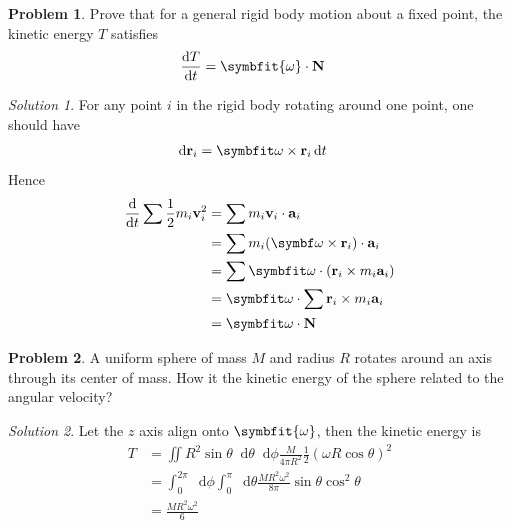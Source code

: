 \documentclass[twoside,11pt]{article}
\newcommand{\lms}{\fontfamily{lmss}\selectfont} %
\renewcommand*\d{\mathop{}\!\mathrm{d}}
\theoremstyle{definition}
\newtheorem{problem}{\lms Problem}
\theoremstyle{remark}
\newtheorem*{solution}{Solution}
\begin{document}
\begin{problem} 
Prove that for a general rigid body motion about a fixed point, the kinetic
energy $T$ satisfies
\begin{align}
    \frac{\d T}{\d t} &= \symbfit{\omega}\cdot \mathbf{N}
\end{align}
\end{problem}
\begin{solution} 
For any point $i$ in the rigid body rotating around one point,
one should have
\begin{align*}
    \d\mathbf r_i &= \symbfit\omega\times\mathbf r_i\d t
\end{align*}
Hence
\begin{align*}
    \frac{\d}{\d t}\sum\frac{1}{2}m_i\mathbf{v}_i^2
    &= \sum m_i\mathbf v_i\cdot\mathbf a_i\\
    &= \sum m_i(\symbf\omega\times\mathbf r_i)\cdot \mathbf a_i\\
    &= \sum\symbfit\omega\cdot(\mathbf r_i\times m_i\mathbf a_i)\\
    &= \symbfit\omega\cdot\sum\mathbf r_i\times m_i\mathbf a_i\\
    &= \symbfit\omega\cdot\mathbf N
\end{align*}
\end{solution}


\begin{problem}
A uniform sphere of mass $M$ and radius $R$ rotates around an axis through its
center of mass.
How it the kinetic energy of the sphere related to the angular velocity?
\end{problem}
\begin{solution}
Let the $z$ axis align onto $\symbfit{\omega}$, then
the kinetic energy is
\begin{align*}
    T &= \iint R^2\sin\theta \d\theta\d\phi\frac{M}{4\pi R^2}
    \frac{1}{2}(\omega R\cos\theta)^2\\
      &= \int_0^{2\pi}\d \phi\int_0^\pi\d\theta
      \frac{MR^2\omega^2}{8\pi}\sin\theta\cos^2\theta\\
      &= \frac{MR^2\omega^2}{6}
\end{align*}
\end{solution}



\end{document}
